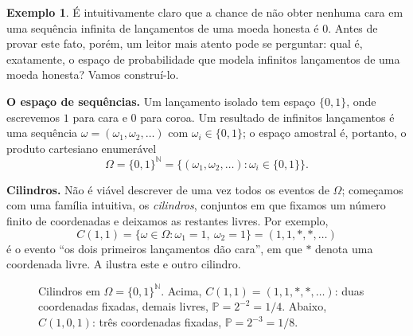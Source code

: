\documentclass[12pt,portuguese]{article}
\theoremstyle{definition}
\newtheorem{example}[example]{Exemplo}
\begin{document}
\begin{example}\label{ex:1.55}
É intuitivamente claro que a chance de não obter nenhuma cara em uma sequência
infinita de lançamentos de uma moeda honesta é \(0\). Antes de provar este fato, porém,
um leitor mais atento pode se perguntar: qual é, exatamente, o espaço de
probabilidade que modela infinitos lançamentos de uma moeda honesta?
Vamos construí-lo.

\noindent\textbf{O espaço de sequências.} Um lançamento isolado tem espaço
\(\{0,1\}\), onde escrevemos \(1\) para cara e \(0\) para coroa. Um resultado
de infinitos lançamentos é uma sequência
\(\omega = (\omega_1, \omega_2, \ldots)\) com \(\omega_i \in \{0,1\}\); o
espaço amostral é, portanto, o produto cartesiano enumerável
\[
\Omega = \{0,1\}^{\mathbb{N}} = \{ (\omega_1,\omega_2,\ldots) : \omega_i \in \{0,1\} \}.
\]

\noindent\textbf{Cilindros.} Não é viável descrever de uma vez todos os eventos de
\(\Omega\); começamos com uma família intuitiva, os \emph{cilindros}, conjuntos
em que fixamos um número finito de coordenadas e deixamos as restantes livres.
Por exemplo,
\[
C(1,1) = \{ \omega \in \Omega : \omega_1 = 1,\ \omega_2 = 1 \} = (1,1,*,*,\ldots)
\]
é o evento ``os dois primeiros lançamentos dão cara'', em que \(*\) denota uma
coordenada livre. A  ilustra este e outro cilindro.

\begin{figure}[H]
\centering
{}
\caption{Cilindros em \(\Omega = \{0,1\}^{\mathbb{N}}\). Acima,
\(C(1,1) = (1,1,*,*,\ldots)\): duas coordenadas fixadas, demais livres,
\(\mathbb{P} = 2^{-2} = 1/4\). Abaixo, \(C(1,0,1)\): três coordenadas
fixadas, \(\mathbb{P} = 2^{-3} = 1/8\).}\label{fig:cilindros}
\end{figure}


\end{example}
\end{document}
